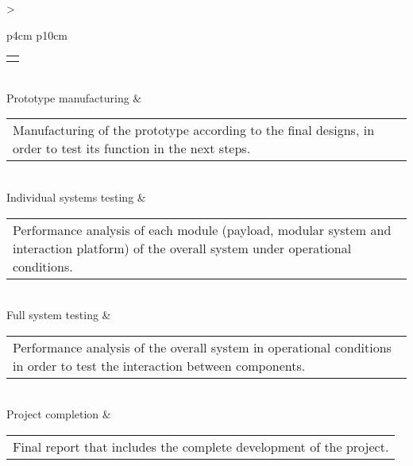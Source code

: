 \begin{longtable}[H]{>{\raggedright\arraybackslash}p{4cm} p{10cm}}
\begin{tabular}[c]{@{}l@{}}
\begin{minipage}[t]{\linewidth}
	\end{minipage} \end{tabular}                                                                                                                    \\ \midrule
	Prototype manufacturing & \begin{tabular}[c]{@{}l@{}}\begin{minipage}[t]{\linewidth}
			Manufacturing of the prototype according to the final designs, in order to test its function in the next steps.  \vspace{0.3cm}
	\end{minipage} \end{tabular}                                                                                                                    \\ \midrule
	Individual systems testing & \begin{tabular}[c]{@{}l@{}}\begin{minipage}[t]{\linewidth}
			Performance analysis of each module (payload, modular system and interaction platform) of the overall system under operational conditions.\vspace{0.3cm}
	\end{minipage} \end{tabular} \\ \midrule
	Full system testing & \begin{tabular}[c]{@{}l@{}}\begin{minipage}[t]{\linewidth}
			Performance analysis of the overall system in operational conditions in order to test the interaction between components.\vspace{0.3cm}
	\end{minipage} \end{tabular}                                                                                                                    \\ \midrule
	Project completion & \begin{tabular}[c]{@{}l@{}}\begin{minipage}[t]{\linewidth}
			Final report that includes the complete development of the project.\vspace{0.3cm}
	\end{minipage} \end{tabular}  
	
	
	\\ \bottomrule[2pt]
	\caption{Project Milestones}
\end{longtable}